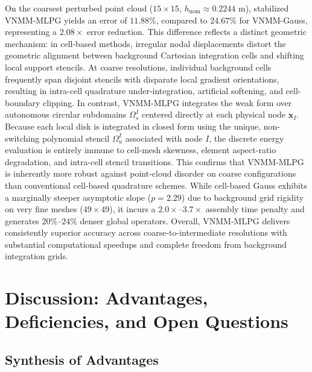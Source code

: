 \documentclass[VANCOUVER,Times1COL]{WileyNJD-v5}
\begin{document}
\begin{enumerate}
    On the coarsest perturbed point cloud ($15 \times 15$, $h_{\mathrm{nom}} \approx 0.2244\text{ m}$), stabilized VNMM-MLPG yields an error of $11.88\%$, compared to $24.67\%$ for VNMM-Gauss, representing a $2.08\times$ error reduction. This difference reflects a distinct geometric mechanism: in cell-based methods, irregular nodal displacements distort the geometric alignment between background Cartesian integration cells and shifting local support stencils. At coarse resolutions, individual background cells frequently span disjoint stencils with disparate local gradient orientations, resulting in intra-cell quadrature under-integration, artificial softening, and cell-boundary clipping. In contrast, VNMM-MLPG integrates the weak form over autonomous circular subdomains $\Omega_s^I$ centered directly at each physical node $\mathbf{x}_I$. Because each local disk is integrated in closed form using the unique, non-switching polynomial stencil $\Omega_u^I$ associated with node $I$, the discrete energy evaluation is entirely immune to cell-mesh skewness, element aspect-ratio degradation, and intra-cell stencil transitions. This confirms that VNMM-MLPG is inherently more robust against point-cloud disorder on coarse configurations than conventional cell-based quadrature schemes. While cell-based Gauss exhibits a marginally steeper asymptotic slope ($p = 2.29$) due to background grid rigidity on very fine meshes ($49\times 49$), it incurs a $2.0\times\text{--}3.7\times$ assembly time penalty and generates $20\%\text{--}24\%$ denser global operators. Overall, VNMM-MLPG delivers consistently superior accuracy across coarse-to-intermediate resolutions with substantial computational speedups and complete freedom from background integration grids.
\end{enumerate}

\section{Discussion: Advantages, Deficiencies, and Open Questions}
\label{sec:discussion}

\subsection{Synthesis of Advantages}
\label{subsec:advantages_synthesis}
\end{document}

